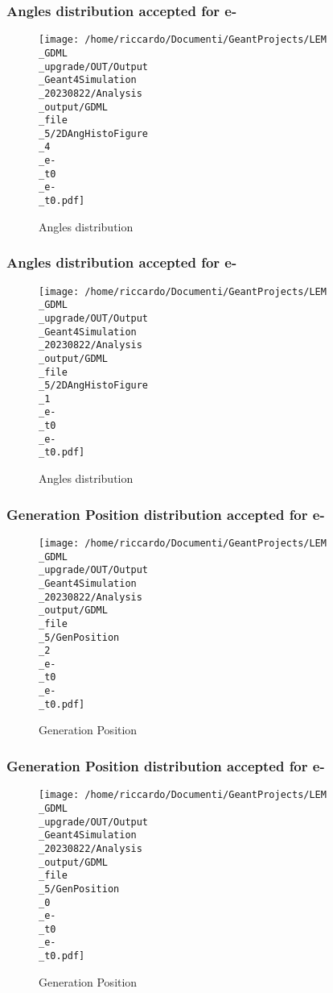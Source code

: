 \documentclass[8pt]{beamer}
\begin{document}
            \begin{frame}
                \frametitle{Angles distribution accepted for e-}
            
        \begin{figure}[h]
            \centering
            \texttt{[image: /home/riccardo/Documenti/GeantProjects/LEM\\\_GDML\\\_upgrade/OUT/Output\\\_Geant4Simulation\\\_20230822/Analysis\\\_output/GDML\\\_file\\\_5/2DAngHistoFigure\\\_4\\\_e-\\\_t0\\\_e-\\\_t0.pdf]}
            \caption{Angles distribution}
        \end{figure}
        
            \end{frame}
            
            \begin{frame}
                \frametitle{Angles distribution accepted for e-}
            
        \begin{figure}[h]
            \centering
            \texttt{[image: /home/riccardo/Documenti/GeantProjects/LEM\\\_GDML\\\_upgrade/OUT/Output\\\_Geant4Simulation\\\_20230822/Analysis\\\_output/GDML\\\_file\\\_5/2DAngHistoFigure\\\_1\\\_e-\\\_t0\\\_e-\\\_t0.pdf]}
            \caption{Angles distribution}
        \end{figure}
        
            \end{frame}
            
            \begin{frame}
                \frametitle{Generation Position distribution accepted for e-}
            
        \begin{figure}[h]
            \centering
            \texttt{[image: /home/riccardo/Documenti/GeantProjects/LEM\\\_GDML\\\_upgrade/OUT/Output\\\_Geant4Simulation\\\_20230822/Analysis\\\_output/GDML\\\_file\\\_5/GenPosition\\\_2\\\_e-\\\_t0\\\_e-\\\_t0.pdf]}
            \caption{Generation Position}
        \end{figure}
        
            \end{frame}
            
            \begin{frame}
                \frametitle{Generation Position distribution accepted for e-}
            
        \begin{figure}[h]
            \centering
            \texttt{[image: /home/riccardo/Documenti/GeantProjects/LEM\\\_GDML\\\_upgrade/OUT/Output\\\_Geant4Simulation\\\_20230822/Analysis\\\_output/GDML\\\_file\\\_5/GenPosition\\\_0\\\_e-\\\_t0\\\_e-\\\_t0.pdf]}
            \caption{Generation Position}
        \end{figure}
        
            \end{frame}
            
\end{document}
